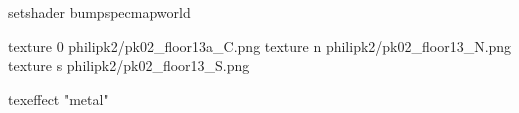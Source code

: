 setshader bumpspecmapworld

texture 0 philipk2/pk02_floor13a_C.png
texture n philipk2/pk02_floor13_N.png
texture s philipk2/pk02_floor13_S.png

texeffect "metal"
